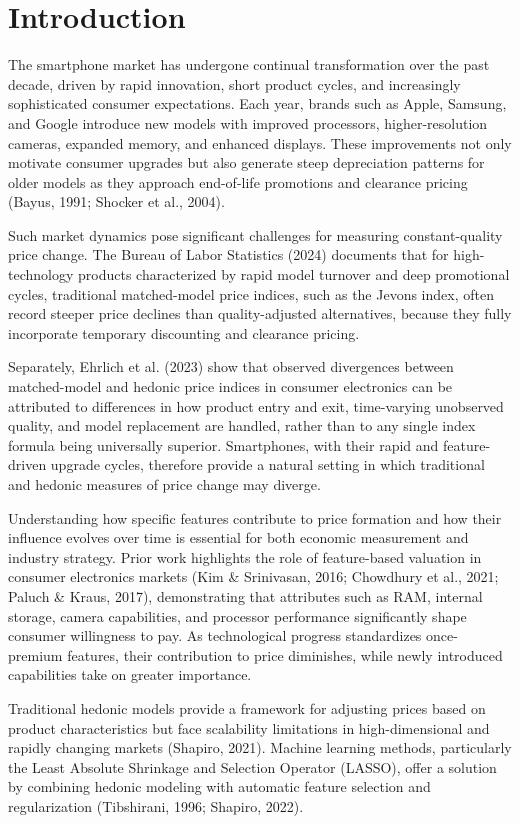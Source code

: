 \documentclass[12pt]{article}
\begin{document}
\section{Introduction}

The smartphone market has undergone continual transformation over the past decade, driven by rapid innovation, short product cycles, and increasingly sophisticated consumer expectations. Each year, brands such as Apple, Samsung, and Google introduce new models with improved processors, higher-resolution cameras, expanded memory, and enhanced displays. These improvements not only motivate consumer upgrades but also generate steep depreciation patterns for older models as they approach end-of-life promotions and clearance pricing (Bayus, 1991; Shocker et al., 2004).

Such market dynamics pose significant challenges for measuring constant-quality price change. The Bureau of Labor Statistics (2024) documents that for high-technology products characterized by rapid model turnover and deep promotional cycles, traditional matched-model price indices, such as the Jevons index, often record steeper price declines than quality-adjusted alternatives, because they fully incorporate temporary discounting and clearance pricing. 

Separately, Ehrlich et al. (2023) show that observed divergences between matched-model and hedonic price indices in consumer electronics can be attributed to differences in how product entry and exit, time-varying unobserved quality, and model replacement are handled, rather than to any single index formula being universally superior. Smartphones, with their rapid and feature-driven upgrade cycles, therefore provide a natural setting in which traditional and hedonic measures of price change may diverge.


Understanding how specific features contribute to price formation and how their influence evolves over time is essential for both economic measurement and industry strategy. Prior work highlights the role of feature-based valuation in consumer electronics markets (Kim \& Srinivasan, 2016; Chowdhury et al., 2021; Paluch \& Kraus, 2017), demonstrating that attributes such as RAM, internal storage, camera capabilities, and processor performance significantly shape consumer willingness to pay. As technological progress standardizes once-premium features, their contribution to price diminishes, while newly introduced capabilities take on greater importance.

Traditional hedonic models provide a framework for adjusting prices based on product characteristics but face scalability limitations in high-dimensional and rapidly changing markets (Shapiro, 2021). Machine learning methods, particularly the Least Absolute Shrinkage and Selection Operator (LASSO), offer a solution by combining hedonic modeling with automatic feature selection and regularization (Tibshirani, 1996; Shapiro, 2022). 
\end{document}
